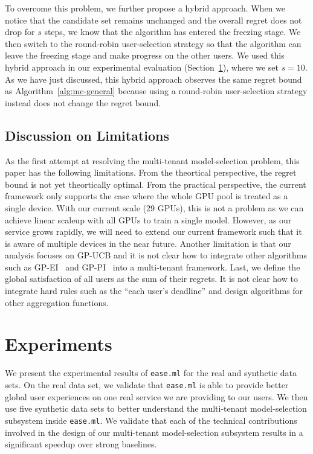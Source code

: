 \documentclass[letterpaper]{vldb}
\newcommand{\eml}{\texttt{ease.ml}\xspace}
\begin{document}
To overcome this problem, we further propose a hybrid approach.
When we notice that the candidate set remains unchanged and the overall regret does not drop for $s$ steps,
we know that the algorithm has entered the freezing stage.
We then switch to the round-robin user-selection strategy so that the algorithm can leave the freezing stage and make progress on the other users.
We used this hybrid approach in our experimental evaluation (Section~\ref{sec:experiments}), where we set $s=10$.
As we have just discussed, this hybrid approach observes the same regret bound as Algorithm~\ref{alg:mc-general} because using a round-robin user-selection strategy instead does not change the regret bound.

\vspace{0.5em}
\subsection{Discussion on Limitations} \label{sec:limitations}

As the first attempt
at resolving the multi-tenant model-selection problem,
this paper has the following limitations.
From the theortical perspective, the regret bound
is not yet theortically optimal.
From the practical perspective,
the current framework only supports the case where
the whole GPU pool is treated as a single device.
With our current scale (29 GPUs), this is not
a problem as we can achieve linear scaleup
with all GPUs to train a single model. However, as our service grows
rapidly, we will need to extend our current framework
such that it is aware of multiple devices in the near future.
Another limitation is that our
analysis focuses on GP-UCB and it is not clear
how to integrate other algorithms such as
GP-EI~\cite{SnoekLA12} and GP-PI~\cite{Kushner1964} into a multi-tenant 
framework. Last, we define the global
satisfaction of all users as the sum 
of their regrets. It is not clear how to
integrate hard rules such as the ``each user's deadline'' 
and design
algorithms for other aggregation functions.

\section{Experiments}\label{sec:experiments}

We present the experimental results of 
\eml for the real and synthetic data sets.
On the real data set, we validate that
\eml is able to provide
better global user experiences on one
real service we are providing to our users. 
We then use five synthetic data sets
to better understand the multi-tenant model-selection subsystem inside \eml. We validate
that each of the technical contributions 
involved in the design of our 
multi-tenant model-selection subsystem
results in a significant speedup
over strong baselines.
\end{document}
